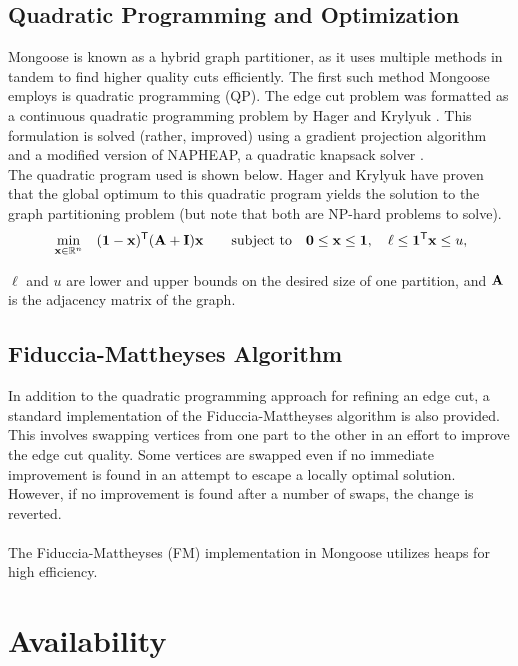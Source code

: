 \documentclass[letter]{article}
\newcommand{\mb}[1]{{\bf{#1}}}
\newcommand{\tr}{^{\sf T}}
\begin{document}
\subsection{Quadratic Programming and Optimization}

Mongoose is known as a hybrid graph partitioner, as it uses multiple methods in tandem to find higher quality cuts efficiently. The first such method Mongoose employs is quadratic programming (QP). The edge cut problem was formatted as a continuous quadratic programming problem by Hager and Krylyuk \cite{HagerKrylyuk1999}. This formulation is solved (rather, improved) using a gradient projection algorithm and a modified version of NAPHEAP, a quadratic knapsack solver \cite{DavisHagerHungerford2016}.
\\

The quadratic program used is shown below. Hager and Krylyuk have proven that the global optimum to this quadratic program yields the solution to the graph partitioning problem (but note that both are NP-hard problems to solve).
%
\begin{eqnarray}
&\displaystyle\min_{\mb{x}\in\mathbb{R}^n}\quad  (\mb{1} - \mb{x})\tr (\mb{A} + \mb{I})\mb{x}
& \quad \mbox{subject to}  \quad
\mb{0} \le \mb{x} \le \mb{1}, \quad \ell \le \mb{1}\tr \mb{x} \le u, \nonumber
\end{eqnarray}

$\ell$ and $u$ are lower and upper bounds on the desired size of one partition, and $\mb{A}$ is the adjacency matrix of the graph.

\subsection{Fiduccia-Mattheyses Algorithm}

In addition to the quadratic programming approach for refining an edge cut, a standard implementation of the Fiduccia-Mattheyses algorithm \cite{FiducciaMattheyses1982} is also provided. This involves swapping vertices from one part to the other in an effort to improve the edge cut quality. Some vertices are swapped even if no immediate improvement is found in an attempt to escape a locally optimal solution. However, if no improvement is found after a number of swaps, the change is reverted.\\
\\
The Fiduccia-Mattheyses (FM) implementation in Mongoose utilizes heaps for high efficiency. 

\section{Availability}
\end{document}
